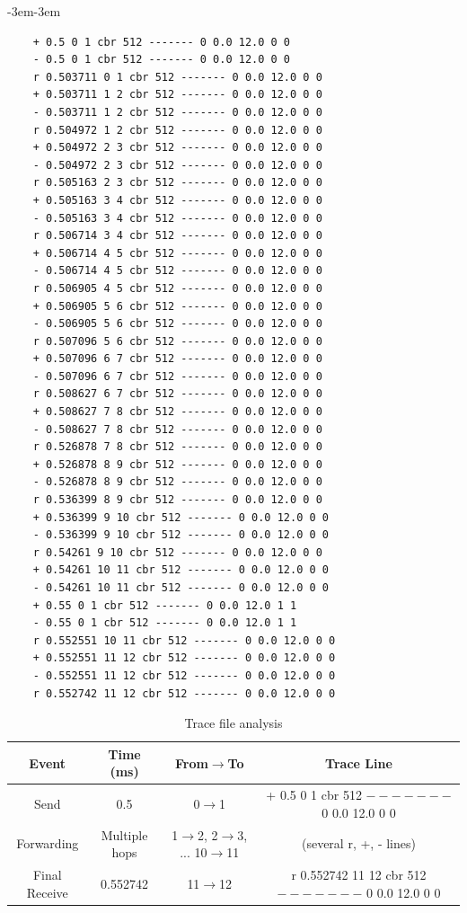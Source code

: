 \documentclass[12pt]{article}
\begin{document}
	\begin{adjustwidth}{-3em}{-3em}
	\begin{lstlisting}
	+ 0.5 0 1 cbr 512 ------- 0 0.0 12.0 0 0
	- 0.5 0 1 cbr 512 ------- 0 0.0 12.0 0 0
	r 0.503711 0 1 cbr 512 ------- 0 0.0 12.0 0 0
	+ 0.503711 1 2 cbr 512 ------- 0 0.0 12.0 0 0
	- 0.503711 1 2 cbr 512 ------- 0 0.0 12.0 0 0
	r 0.504972 1 2 cbr 512 ------- 0 0.0 12.0 0 0
	+ 0.504972 2 3 cbr 512 ------- 0 0.0 12.0 0 0
	- 0.504972 2 3 cbr 512 ------- 0 0.0 12.0 0 0
	r 0.505163 2 3 cbr 512 ------- 0 0.0 12.0 0 0
	+ 0.505163 3 4 cbr 512 ------- 0 0.0 12.0 0 0
	- 0.505163 3 4 cbr 512 ------- 0 0.0 12.0 0 0
	r 0.506714 3 4 cbr 512 ------- 0 0.0 12.0 0 0
	+ 0.506714 4 5 cbr 512 ------- 0 0.0 12.0 0 0
	- 0.506714 4 5 cbr 512 ------- 0 0.0 12.0 0 0
	r 0.506905 4 5 cbr 512 ------- 0 0.0 12.0 0 0
	+ 0.506905 5 6 cbr 512 ------- 0 0.0 12.0 0 0
	- 0.506905 5 6 cbr 512 ------- 0 0.0 12.0 0 0
	r 0.507096 5 6 cbr 512 ------- 0 0.0 12.0 0 0
	+ 0.507096 6 7 cbr 512 ------- 0 0.0 12.0 0 0
	- 0.507096 6 7 cbr 512 ------- 0 0.0 12.0 0 0
	r 0.508627 6 7 cbr 512 ------- 0 0.0 12.0 0 0
	+ 0.508627 7 8 cbr 512 ------- 0 0.0 12.0 0 0
	- 0.508627 7 8 cbr 512 ------- 0 0.0 12.0 0 0
	r 0.526878 7 8 cbr 512 ------- 0 0.0 12.0 0 0
	+ 0.526878 8 9 cbr 512 ------- 0 0.0 12.0 0 0
	- 0.526878 8 9 cbr 512 ------- 0 0.0 12.0 0 0
	r 0.536399 8 9 cbr 512 ------- 0 0.0 12.0 0 0
	+ 0.536399 9 10 cbr 512 ------- 0 0.0 12.0 0 0
	- 0.536399 9 10 cbr 512 ------- 0 0.0 12.0 0 0
	r 0.54261 9 10 cbr 512 ------- 0 0.0 12.0 0 0
	+ 0.54261 10 11 cbr 512 ------- 0 0.0 12.0 0 0
	- 0.54261 10 11 cbr 512 ------- 0 0.0 12.0 0 0
	+ 0.55 0 1 cbr 512 ------- 0 0.0 12.0 1 1
	- 0.55 0 1 cbr 512 ------- 0 0.0 12.0 1 1
	r 0.552551 10 11 cbr 512 ------- 0 0.0 12.0 0 0
	+ 0.552551 11 12 cbr 512 ------- 0 0.0 12.0 0 0
	- 0.552551 11 12 cbr 512 ------- 0 0.0 12.0 0 0
	r 0.552742 11 12 cbr 512 ------- 0 0.0 12.0 0 0
	\end{lstlisting}
	\end{adjustwidth}
	

	
	\begin{table}[H]
		\centering
		\begin{tabular}{|c|c|c|c|}
			\hline
			Event & Time (ms) & From$\rightarrow$To & Trace Line \\
			\hline
			Send & 0.5 & 0$\rightarrow$1 & + 0.5 0 1 cbr 512 $-------$ 0 0.0 12.0 0 0 \\
			\hline
			
			Forwarding & Multiple hops & 1$\rightarrow$2, 2$\rightarrow$3, ... 10$\rightarrow$11 & (several r, +, - lines)\\
			\hline
			
			Final Receive & 0.552742 & 11$\rightarrow$12 & r 0.552742 11 12 cbr 512 $-------$ 0 0.0 12.0 0 0 \\
			\hline
		\end{tabular}
		\caption{Trace file analysis}
		\label{tab:tf}
	\end{table}
\end{document}
